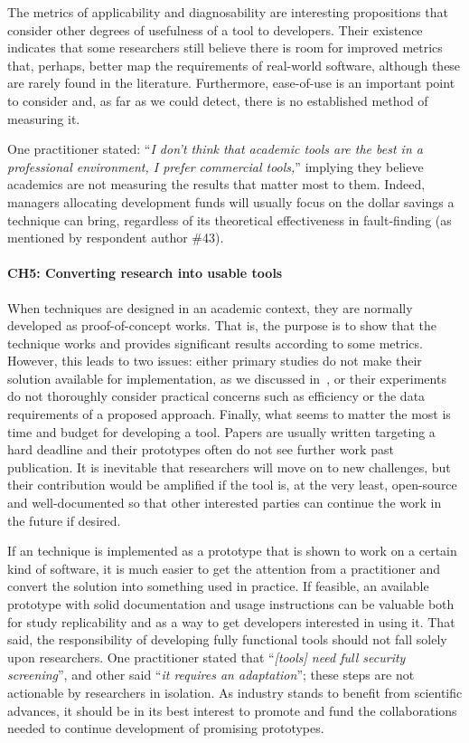 The metrics of applicability and diagnosability  are interesting propositions that consider other degrees of usefulness of a tool to developers.
Their existence indicates that some researchers still believe there is room for improved metrics that, perhaps, better map the requirements of real-world software, although these are rarely found in the literature.
Furthermore, ease-of-use is an important point to consider and, as far as we could detect, there is no established method of measuring it.

One practitioner stated: ``\textit{I don't think that academic tools are the best in a professional environment, I prefer commercial tools,}'' implying they believe academics are not measuring the results that matter most to them.
Indeed, managers allocating development funds will usually focus on the dollar savings a technique can bring, regardless of its theoretical effectiveness in fault-finding (as mentioned by respondent author \#43).

\paragraph{CH5: Converting research into usable tools}
When techniques are designed in an academic context, they are normally developed as proof-of-concept works.
That is, the purpose is to show that the technique works and provides significant results according to some metrics.
However, this leads to two issues: either primary studies do not make their solution available for implementation, as we discussed in~, or their experiments do not thoroughly consider practical concerns such as efficiency or the data requirements of a proposed approach.
Finally, what seems to matter the most is time and budget for developing a tool.
Papers are usually written targeting a hard deadline and their prototypes often do not see further work past publication.
It is inevitable that researchers will move on to new challenges, but their contribution would be amplified if the tool is, at the very least, open-source and well-documented so that other interested parties can continue the work in the future if desired.

If an \rt technique is implemented as a prototype that is shown to work on a certain kind of software, it is much easier to get the attention from a practitioner and convert the solution into something used in practice.
If feasible, an available prototype with solid documentation and usage instructions can be valuable both for study replicability and as a way to get developers interested in using it. 
That said, the responsibility of developing fully functional tools should not fall solely upon researchers.
One practitioner stated that ``\textit{[\rt tools] need full security screening}'', and other said ``\textit{it requires an adaptation}''; these steps are not actionable by researchers in isolation.
As industry stands to benefit from scientific advances, it should be in its best interest to promote and fund the collaborations needed to continue development of promising prototypes.

